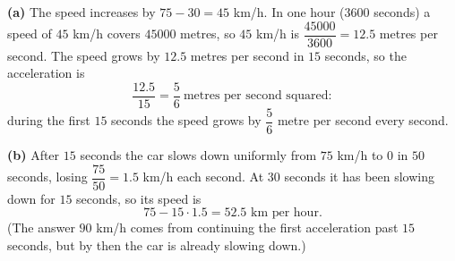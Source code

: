 \textbf{(a)} The speed increases by $75-30=45$ km/h. In one hour ($3600$ seconds) a speed of $45$ km/h covers $45000$ metres, so $45$ km/h is $\dfrac{45000}{3600}=12.5$ metres per second. The speed grows by $12.5$ metres per second in $15$ seconds, so the acceleration is
\[
\dfrac{12.5}{15}=\boxed{\dfrac{5}{6}\ \text{metres per second squared}}:
\]
during the first $15$ seconds the speed grows by $\dfrac{5}{6}$ metre per second every second.

\textbf{(b)} After $15$ seconds the car slows down uniformly from $75$ km/h to $0$ in $50$ seconds, losing $\dfrac{75}{50}=1.5$ km/h each second. At $30$ seconds it has been slowing down for $15$ seconds, so its speed is
\[
75-15\cdot1.5=\boxed{52.5\text{ km per hour}}.
\]
(The answer $90$ km/h comes from continuing the first acceleration past $15$ seconds, but by then the car is already slowing down.)
